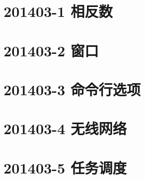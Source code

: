 \documentclass[cn,10pt,math=newtx,citestyle=gb7714-2015,bibstyle=gb7714-2015]{elegantbook}
\newif\ifonlyanalyze %
\begin{document}
\newpage
\section{201403-1 相反数}
\ifonlyanalyze
\else
    
\fi


\newpage
\section{201403-2 窗口}
\ifonlyanalyze
\else
    
\fi


\newpage
\section{201403-3 命令行选项}
\ifonlyanalyze
\else
    
\fi


\newpage
\section{201403-4 无线网络}
\ifonlyanalyze
\else
    
\fi


\newpage
\section{201403-5 任务调度}
\ifonlyanalyze
\else
    
\fi

\end{document}
